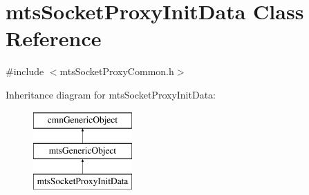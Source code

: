 \hypertarget{classmts_socket_proxy_init_data}{}\section{mts\+Socket\+Proxy\+Init\+Data Class Reference}
\label{classmts_socket_proxy_init_data}


{\ttfamily \#include $<$mts\+Socket\+Proxy\+Common.\+h$>$}

Inheritance diagram for mts\+Socket\+Proxy\+Init\+Data\+:\begin{figure}[H]
\begin{center}
\leavevmode
\includegraphics[height=3.000000cm]{d6/de0/classmts_socket_proxy_init_data}
\end{center}
\end{figure}

